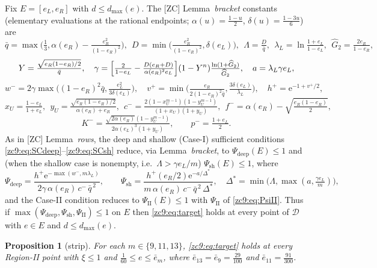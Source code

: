 \documentclass[11pt]{amsart}
\newtheorem{proposition}[theorem]{Proposition}
\newcommand{\eu}{\mathrm{e}}
\newcommand{\D}{\mathcal D}
\begin{document}
Fix $E=[e_L,e_R]$ with $d\le d_{\max}(e)$.  The [ZC] Lemma~\emph{bracket}
constants (elementary evaluations at the rational endpoints;
$\alpha(u)=\tfrac{1-u}2$, $\delta(u)=\tfrac{1-3u}6$) are
\[
 \bar q=\max\bigl(\tfrac13,\alpha(e_R)-\tfrac{e_R^2}{(1-e_R)^2}\bigr),\ \
 D=\min\bigl(\tfrac{e_R^2}{(1-e_R)^2},\delta(e_L)\bigr),\ \
 \Lambda=\tfrac D{\bar q},\ \
 \lambda_L=\ln\tfrac{1+e_L}{1-e_L},\ \
 \widehat G_2=\tfrac{2e_R}{1-e_R},
\]
\[
 Y=\tfrac{\sqrt{e_R(1-e_R)/2}}{\bar q},\quad
 \gamma=\Bigl[\tfrac2{1-e_L}-\tfrac{D(e_R+D)}{\alpha(e_R)^2e_L}\Bigr]
 (1-Y^n)\tfrac{\ln(1+\widehat G_2)}{\widehat G_2},\quad
 a=\lambda_L\gamma e_L,
\]
\[
 w^-=2\gamma\max\bigl((1-e_R)^2\bar q,\tfrac{e_L^2}{3\delta(e_L)}\bigr),\quad
 v^+=\min\bigl(\tfrac{e_R}{2(1-e_R)^2\bar q},\tfrac{3\delta(e_L)}{\lambda_L}\bigr),\quad
 h^+=\eu^{-1+v^+/2},
\]
\[
 x_U=\tfrac{1-e_L}{1+e_L},\ \
 y_U=\tfrac{\sqrt{e_R(1-e_R)/2}}{\alpha(e_R)+e_R},\ \
 c^-=\tfrac{2(1-x_U^{m-1})(1-y_U^{m-1})}{(1+x_U)(1+y_U)},\ \
 f^-=\alpha(e_R)-\sqrt{\tfrac{e_R(1-e_R)}2},
\]
\[
 K^-=\tfrac{\sqrt{2\alpha(e_R)}(1-y_U^{m-1})}{2\alpha(e_L)^3(1+y_U)},\qquad
 p^-=\tfrac{1+e_L}2 .
\]
As in [ZC] Lemma~\emph{rows}, the deep and shallow (Case-I) sufficient
conditions \eqref{zc9:eq:SCdeep}--\eqref{zc9:eq:SCsh} reduce, via
Lemma~\emph{bracket}, to $\Psi_{\mathrm{deep}}(E)\le1$ and (when the shallow case
is nonempty, i.e.\ $\Lambda>\gamma e_L/m$) $\Psi_{\mathrm{sh}}(E)\le1$, where
\[
 \Psi_{\mathrm{deep}}=\frac{h^+\eu^{-\max(w^-,m\lambda_L)}}
 {2\gamma\,\alpha(e_R)\,c^-\,\bar q^{\,2}},\qquad
 \Psi_{\mathrm{sh}}=\frac{h^+(e_R/2)\eu^{-a/\Delta^*}}
 {m\,\alpha(e_R)\,c^-\,\bar q^{\,2}\,\Delta^*},\quad
 \Delta^*=\min\bigl(\Lambda,\max(a,\tfrac{\gamma e_L}m)\bigr),
\]
and the Case-II condition reduces to $\Psi_{\mathrm{II}}(E)\le1$ with
$\Psi_{\mathrm{II}}$ of \eqref{zc9:eq:PsiII}.  Thus if
$\max(\Psi_{\mathrm{deep}},\Psi_{\mathrm{sh}},\Psi_{\mathrm{II}})\le1$ on $E$
then \eqref{zc9:eq:target} holds at every point of $\D$ with $e\in E$ and
$d\le d_{\max}(e)$.

\begin{proposition}[strip]\label{zc9:prop:strip}
For each $m\in\{9,11,13\}$, \eqref{zc9:eq:target} holds at every Region-II point
with $\xi\le1$ and $\tfrac1{60}\le e\le\bar e_m$, where
$\bar e_{13}=\bar e_9=\tfrac{29}{100}$ and $\bar e_{11}=\tfrac{91}{300}$.
\end{proposition}
\end{document}
